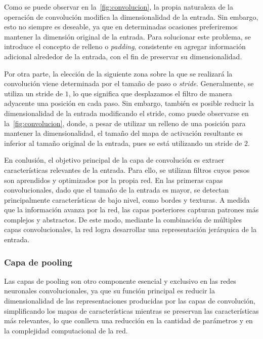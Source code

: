 Como se puede observar en la~\autoref{fig:convolucion}, la propia naturaleza de la operación de convolución modifica la dimensionalidad de la entrada. Sin embargo, esto no siempre es deseable, ya que en determinadas ocasiones preferiremos mantener la dimensión original de la entrada. Para solucionar este problema, se introduce el concepto de relleno o \emph{padding}, consistente en agregar información adicional alrededor de la entrada, con el fin de preservar su dimensionalidad.\newline

Por otra parte, la elección de la siguiente zona sobre la que se realizará la convolución viene determinada por el tamaño de paso o \emph{stride}. Generalmente, se utiliza un stride de $1$, lo que significa que desplazamos el filtro de manera adyacente una posición en cada paso. Sin embargo, también es posible reducir la dimensionalidad de la entrada modificando el stride, como puede observarse en la~\autoref{fig:convolucion}, donde, a pesar de utilizar un relleno de una posición para mantener la dimensionalidad, el tamaño del mapa de activación resultante es inferior al tamaño original de la entrada, pues se está utilizando un stride de $2$.\newline

En conlusión, el objetivo principal de la capa de convolución es extraer características relevantes de la entrada. Para ello, se utilizan filtros cuyos pesos son aprendidos y optimizados por la propia red. En las primeras capas convolucionales, dado que el tamaño de la entrada es mayor, se detectan principalmente características de bajo nivel, como bordes y texturas. A medida que la información avanza por la red, las capas posteriores capturan patrones más complejos y abstractos. De este modo, mediante la combinación de múltiples capas convolucionales, la red logra desarrollar una representación jerárquica de la entrada.\newline

\subsubsection{Capa de pooling}

Las capas de pooling son otro componente esencial y exclusivo en las redes neuronales convolucionales, ya que su función principal es reducir la dimensionalidad de las representaciones producidas por las capas de convolución, simplificando los mapas de características mientras se preservan las características más relevantes, lo que conlleva una reducción en la cantidad de parámetros y en la complejidad computacional de la red.\newline

